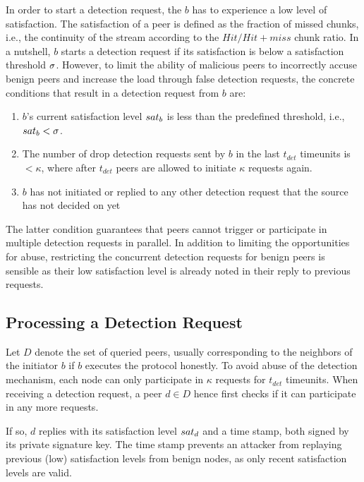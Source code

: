 In order to start a detection request, the $b$ has to experience a low level of satisfaction. 
The satisfaction of a peer is defined as the fraction of missed chunks, i.e., the continuity of the stream according to the $Hit/Hit+miss$ chunk ratio. 
In a nutshell, $b$ starts a detection request if its satisfaction is below a satisfaction threshold $\sigma$.
However, to limit the ability of malicious peers to incorrectly accuse benign peers and increase the load through false detection requests, the concrete conditions that result in a detection request from $b$ are: 
\begin{enumerate}
 \item $b$'s current satisfaction level $sat_b$ is less than the predefined threshold, i.e., $sat_b < \sigma$.
 \item The number of drop detection requests sent by $b$ in the last $t_{det}$ timeunits is $< \kappa$, where after $t_{det}$ peers are allowed to initiate $\kappa$ requests again. 
 \item $b$ has not initiated or replied to any other \drop detection request that the source has not decided on yet
\end{enumerate}
The latter condition guarantees that peers cannot trigger or participate in multiple detection requests in parallel. In addition to limiting the opportunities for abuse, restricting the concurrent detection requests for benign peers is sensible as their low satisfaction level is already noted in their reply to previous requests. 

\subsection{Processing a Detection Request}
Let $D$ denote the set of queried peers, usually corresponding to the neighbors of the initiator $b$ if $b$ executes the protocol honestly.  
To avoid abuse of the detection mechanism, each node can only participate in $\kappa$ requests for $t_{det}$ timeunits. 
When receiving a detection request, a peer $d \in D$ hence first checks if it can participate in any more requests.    
    
If so, $d$ replies with its satisfaction level $sat_d$ and a time stamp, both signed by its private signature key. 
The time stamp prevents an attacker from replaying previous (low) satisfaction levels from benign nodes, as only recent satisfaction levels are valid.  


